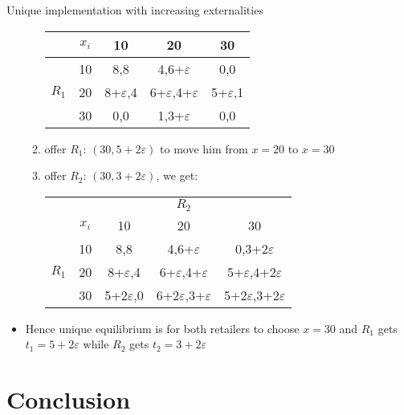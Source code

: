 \documentclass[11pt,english]{beamer}
\newcommand{\ve}{\varepsilon}
\begin{document}
\begin{frame}[allowframebreaks]{Unique implementation with increasing externalities}
\begin{itemize}
\begin{enumerate}
\begin{table}[c]
\begin{tabular}{cc|ccc}
      &$x_i$  & 10 & 20 & 30 \\ \hline
            & 10 & 8,8 & 4,6+$\ve$ & 0,0 \\
      $R_1$ & 20 & 8+$\ve$,4 &6+$\ve$,4+$\ve$ &5+$\ve$,1 \\
            & 30 & 0,0 & 1,3+$\ve$ & 0,0
    \end{tabular}
  \end{table}
    \item offer $R_1$: $(30,5+2\ve)$ to move him from $x=20$ to $x=30$
    \item offer $R_2$: $(30,3+2\ve)$, we get:
  \begin{table}[c]
    \centering
    \begin{tabular}{cc|ccc}
      & & & $R_2$ & \\
      &$x_i$  & 10 & 20 & 30 \\ \hline
            & 10 & 8,8 & 4,6+$\ve$ & 0,3+2$\ve$ \\
      $R_1$ & 20 & 8+$\ve$,4 &6+$\ve$,4+$\ve$ &5+$\ve$,4+2$\ve$ \\
            & 30 & 5+2$\ve$,0 & 6+2$\ve$,3+$\ve$ & 5+2$\ve$,3+2$\ve$
    \end{tabular}
  \end{table}
    \end{enumerate}
  \item Hence unique equilibrium is for both retailers to choose
    $x=30$ and $R_1$ gets $t_1 = 5+2\ve$ while $R_2$ gets $t_2 = 3+2\ve$
  \end{itemize}
\end{frame}

\section{Conclusion}
\end{document}

